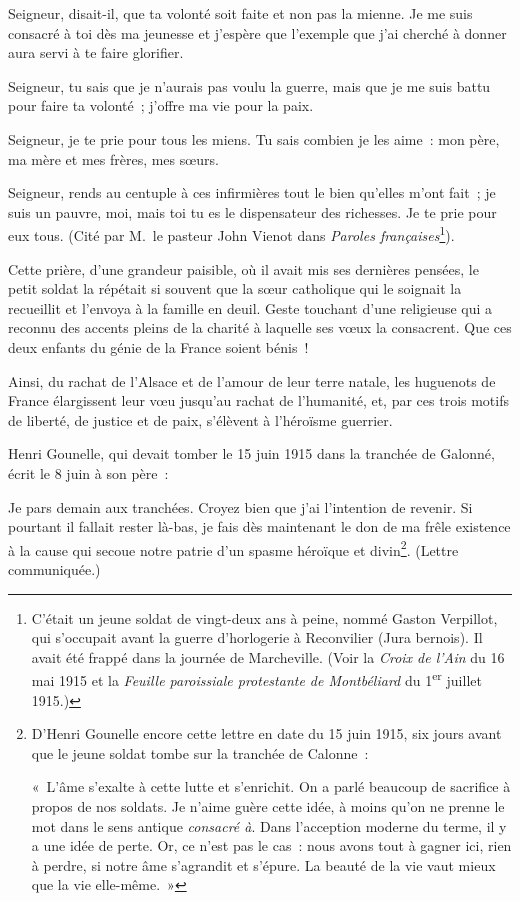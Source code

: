 \documentclass[french,twoside]{book} %
\newenvironment{quoteblock}%
  {\begin{quoting}}
  {\end{quoting}}
\newenvironment{quotebar}{%
    \def\FrameCommand{{\color{rubric!10!}\vrule width 0.5em} \hspace{0.9em}}%
    \def\OuterFrameSep{\itemsep} %
    \MakeFramed {\advance\hsize-\width \FrameRestore}
  }%
  {%
    \endMakeFramed
  }
\renewenvironment{quoteblock}%
  {%
    \savenotes
    \setstretch{0.9}
    \normalfont
    \begin{quotebar}
  }
  {%
    \end{quotebar}
    \spewnotes
  }
\begin{document}
\begin{quoteblock}
 \noindent Seigneur, disait-il, que ta volonté soit faite et non pas la mienne. Je me suis consacré à toi dès ma jeunesse et j’espère que l’exemple que j’ai cherché à donner aura servi à te faire glorifier.‌\par
 Seigneur, tu sais que je n’aurais pas voulu la guerre, mais que je me suis battu pour faire ta volonté ; j’offre ma vie pour la paix.‌\par
 Seigneur, je te prie pour tous les miens. Tu sais combien je les aime : mon père, ma mère et mes frères, mes sœurs.‌\par
 Seigneur, rends au centuple à ces infirmières tout le bien qu’elles m’ont fait ; je suis un pauvre, moi, mais toi tu es le dispensateur des richesses. Je te prie pour eux tous. (Cité par M. le pasteur John Vienot dans {\itshape Paroles françaises}\footnote{\noindent C’était un jeune soldat de vingt-deux ans à peine, nommé Gaston Verpillot, qui s’occupait avant la guerre d’horlogerie à Reconvilier (Jura bernois). Il avait été frappé dans la journée de Marcheville. (Voir la {\itshape Croix de l’Ain} du 16 mai 1915 et la {\itshape Feuille paroissiale protestante de Montbéliard} du 1\textsuperscript{er} juillet 1915.)
 }).‌
 \end{quoteblock}

\noindent Cette prière, d’une grandeur paisible, où il avait mis ses dernières pensées, le petit soldat la répétait si souvent que la sœur catholique qui le soignait la recueillit et l’envoya à la famille en deuil. Geste touchant d’une religieuse qui a reconnu des accents pleins de la charité à laquelle ses vœux la consacrent. Que ces deux enfants du génie de la France soient bénis !‌\par
Ainsi, du rachat de l’Alsace et de l’amour de leur terre natale, les huguenots de France élargissent leur vœu jusqu’au rachat de l’humanité, et, par ces trois motifs de liberté, de justice et de paix, s’élèvent à l’héroïsme guerrier.‌\par
Henri Gounelle, qui devait tomber le 15 juin 1915 dans la tranchée de Galonné, écrit le 8 juin à son père :‌\par

\begin{quoteblock}
 \noindent Je pars demain aux tranchées. Croyez bien que j’ai l’intention de revenir. Si pourtant il fallait rester là-bas, je fais dès maintenant le don de ma frêle existence à la cause qui secoue notre patrie d’un spasme héroïque et divin\footnote{\noindent D’Henri Gounelle encore cette lettre en date du 15 juin 1915, six jours avant que le jeune soldat tombe sur la tranchée de Calonne :‌\par
 \noindent « L’âme s’exalte à cette lutte et s’enrichit. On a parlé beaucoup de sacrifice à propos de nos soldats. Je n’aime guère cette idée, à moins qu’on ne prenne le mot dans le sens antique {\itshape consacré à}. Dans l’acception moderne du terme, il y a une idée de perte. Or, ce n’est pas le cas : nous avons tout à gagner ici, rien à perdre, si notre âme s’agrandit et s’épure. La beauté de la vie vaut mieux que la vie elle-même. »
 }. (Lettre communiquée.)‌
 \end{quoteblock}
\end{document}
